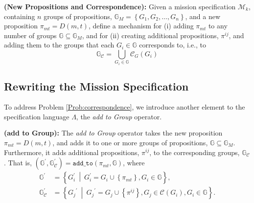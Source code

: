 \begin{myProblem}\label{Prob:correspondence} %
	\textbf{(New Propositions and Correspondence):} Given a mission specification $\mathcal{M}_k$, containing $n$ groups of propositions, $\mathbb{G}_M = \left\{ G_1, G_2, \ldots, G_n \right\}$, and a new proposition $\pi_{mt} = D(m, t)$, define a mechanism for (i) adding $\pi_{mt}$ to any number of groups
$ \mathbb{G} \subseteq \mathbb{G}_M$,
and for (ii) creating additional propositions, $\pi^{ij}$, and adding them to the groups that each $G_i \in \mathbb{G}$ corresponds to, i.e., to
	$$ \mathbb{G}_\mathcal{C} = \bigcup_{G_i \in \mathbb{G}} \mathcal{C}_G (G_i)$$
\end{myProblem}

\subsection{Rewriting the Mission Specification}\label{rewriting}

To address Problem \ref{Prob:correspondence}, we introduce another element to the specification language $\Lambda$, the \emph{add to Group} operator.

\begin{myDefinition}\label{Def:addto}
	\textbf{(add to Group):} The \emph{add to Group} operator takes the new proposition $\pi_{mt} = D(m,t)$, and adds it to one or more groups of propositions, 
	$ \mathbb{G} \subseteq \mathbb{G}_M$.
	Furthermore, it adds additional propositions, $\pi^{ij}$, to the corresponding groups,
	$\mathbb{G}_\mathcal{C}$.
	That is,
	$(\mathbb{G}^\prime, \mathbb{G}_{\mathcal{C}}^\prime) = \texttt{add\_to}(\pi_{mt}, \mathbb{G})$,
	where
	\vspace{-13 pt}
	\begin{subequations}
	\begin{align*}
		\mathbb{G}^\prime &= \left\{ G_i^\prime \: \middle| \: G_i^\prime = G_i \cup \left\{ \pi_{mt} \right\}, G_i \in \mathbb{G} \right\},\\
		\mathbb{G}_{\mathcal{C}}^\prime &= \left\{{G_j}^\prime \: \middle| \: {G_j}^\prime = G_j \cup \left\{ \pi^{ij} \right\}, G_j \in \mathcal{C}(G_i), G_i \in \mathbb{G} \right\}.
	\end{align*}
	\end{subequations}
\end{myDefinition}

